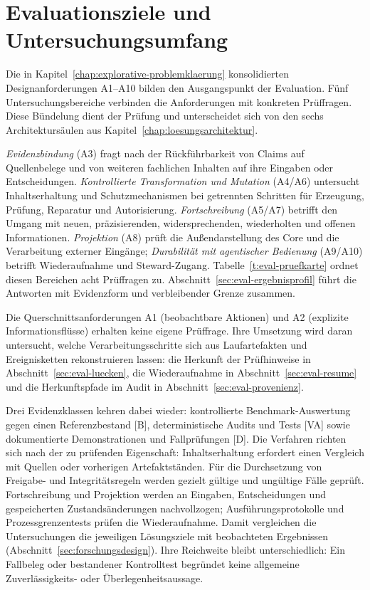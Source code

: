 \section{Evaluationsziele und Untersuchungsumfang}
\label{sec:eval-ziele}

Die in Kapitel~\ref{chap:explorative-problemklaerung} konsolidierten
Designanforderungen A1--A10 bilden den Ausgangspunkt der Evaluation.
Fünf Untersuchungsbereiche verbinden die Anforderungen mit konkreten
Prüffragen. Diese Bündelung dient der Prüfung und unterscheidet sich
von den sechs Architektursäulen aus Kapitel~\ref{chap:loesungsarchitektur}.

\emph{Evidenzbindung} (A3) fragt nach der Rückführbarkeit von Claims
auf Quellenbelege und von weiteren fachlichen Inhalten auf ihre
Eingaben oder Entscheidungen. \emph{Kontrollierte Transformation
und Mutation} (A4/A6) untersucht Inhaltserhaltung und Schutzmechanismen
bei getrennten Schritten für Erzeugung, Prüfung, Reparatur und
Autorisierung. \emph{Fortschreibung} (A5/A7) betrifft den Umgang mit
neuen, präzisierenden, widersprechenden, wiederholten und offenen
Informationen. \emph{Projektion} (A8) prüft die Außendarstellung des
Core und die Verarbeitung externer Eingänge; \emph{Durabilität mit
agentischer Bedienung} (A9/A10) betrifft Wiederaufnahme und Steward-Zugang.
Tabelle~\ref{t:eval-pruefkarte} ordnet diesen Bereichen acht Prüffragen
zu. Abschnitt~\ref{sec:eval-ergebnisprofil} führt die Antworten mit
Evidenzform und verbleibender Grenze zusammen.

Die Querschnittsanforderungen A1 (beobachtbare Aktionen) und A2
(explizite Informationsflüsse) erhalten keine eigene Prüffrage.
Ihre Umsetzung wird daran untersucht, welche Verarbeitungsschritte
sich aus Laufartefakten und Ereignisketten rekonstruieren lassen:
die Herkunft der Prüfhinweise in Abschnitt~\ref{sec:eval-luecken},
die Wiederaufnahme in Abschnitt~\ref{sec:eval-resume} und die
Herkunftspfade im Audit in Abschnitt~\ref{sec:eval-provenienz}.



Drei Evidenzklassen kehren dabei wieder: kontrollierte
Benchmark-Auswertung gegen einen Referenzbestand [B],
deterministische Audits und Tests [VA] sowie dokumentierte
Demonstrationen und Fallprüfungen [D]. Die Verfahren richten sich nach der zu
prüfenden Eigenschaft: Inhaltserhaltung erfordert einen Vergleich
mit Quellen oder vorherigen Artefaktständen. Für die Durchsetzung
von Freigabe- und Integritätsregeln werden gezielt gültige und
ungültige Fälle geprüft. Fortschreibung und Projektion werden an
Eingaben, Entscheidungen und gespeicherten Zustandsänderungen
nachvollzogen; Ausführungsprotokolle und Prozessgrenzentests
prüfen die Wiederaufnahme. Damit vergleichen die Untersuchungen
die jeweiligen Lösungsziele mit beobachteten Ergebnissen
(Abschnitt~\ref{sec:forschungsdesign}). Ihre Reichweite bleibt
unterschiedlich: Ein Fallbeleg oder bestandener Kontrolltest
begründet keine allgemeine Zuverlässigkeits- oder Überlegenheitsaussage.

